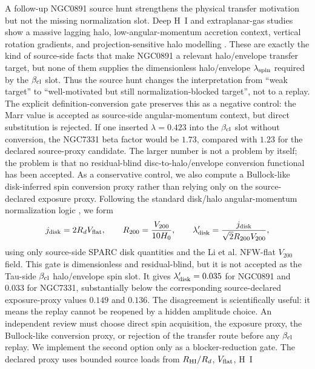 \documentclass[11pt]{article}
\begin{document}
A follow-up NGC0891 source hunt strengthens the physical transfer motivation
but not the missing normalization slot.  Deep H~I and extraplanar-gas studies
show a massive lagging halo, low-angular-momentum accretion context, vertical
rotation gradients, and projection-sensitive halo modelling
\cite{Oosterloo2007ColdGaseousHaloNGC891,FraternaliBinney2006ExtraplanarGas,Fraternali2004ExtraPlanarNGC891,Ciotti2010StationaryExtraplanarGas}.
These are exactly the kind of source-side facts that make NGC0891 a relevant
halo/envelope transfer target, but none of them supplies the dimensionless
halo/envelope \(\lambda_{\rm spin}\) required by the \(\beta_{\rm cl}\) slot.
Thus the source hunt changes the interpretation from ``weak target'' to
``well-motivated but still normalization-blocked target'', not to a replay.
The explicit definition-conversion gate preserves this as a negative control:
the Marr value is accepted as source-side angular-momentum context, but direct
substitution is rejected.  If one inserted \(\lambda=0.423\) into the
\(\beta_{\rm cl}\) slot without conversion, the NGC7331 beta factor would be
\(1.73\), compared with \(1.23\) for the declared source-proxy candidate.  The
larger number is not a problem by itself; the problem is that no residual-blind
disc-to-halo/envelope conversion functional has been accepted.
As a conservative control, we also compute a Bullock-like disk-inferred spin
conversion proxy rather than relying only on the source-declared exposure
proxy.  Following the standard disk/halo angular-momentum normalization
logic \cite{MoMaoWhite1998DiscFormation,Bullock2001UniversalAngularMomentum},
we form
\[
  j_{\rm disk}=2R_dV_{\rm flat},\qquad
  R_{200}=\frac{V_{200}}{10H_0},\qquad
  \lambda'_{\rm disk}
  =
  \frac{j_{\rm disk}}{\sqrt{2}R_{200}V_{200}},
\]
using only source-side SPARC disk quantities and the Li et al. NFW-flat
\(V_{200}\) field.  This gate is dimensionless and residual-blind, but it is
not accepted as the Tau-side \(\beta_{\rm cl}\) halo/envelope spin slot.  It
gives \(\lambda'_{\rm disk}=0.035\) for NGC0891 and \(0.033\) for NGC7331,
substantially below the corresponding source-declared exposure-proxy values
\(0.149\) and \(0.136\).  The disagreement is scientifically useful: it means
the replay cannot be reopened by a hidden amplitude choice.  An independent
review must choose direct spin acquisition, the exposure proxy, the
Bullock-like conversion proxy, or rejection of the transfer route before any
\(\beta_{\rm cl}\) replay.
We implement the second option only as a blocker-reduction gate.  The declared
proxy uses bounded source loads from \(R_{\rm HI}/R_d\), \(V_{\rm flat}\), H~I
\end{document}
